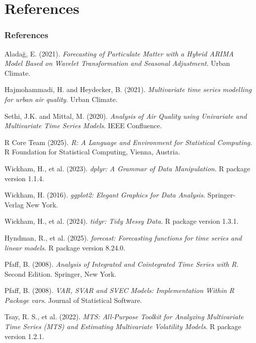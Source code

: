 \documentclass[svgnames, 12pt]{beamer}
\begin{document}
\section*{References}
\begin{frame}[allowframebreaks] %
    \frametitle{References}
    \footnotesize
    \begin{thebibliography}{99} %
        Aladağ, E. (2021). \textit{Forecasting of Particulate Matter with a Hybrid ARIMA Model Based on Wavelet Transformation and Seasonal Adjustment}. Urban Climate.
        
        Hajmohammadi, H. and Heydecker, B. (2021). \textit{Multivariate time series modelling for urban air quality}. Urban Climate.
        
        Sethi, J.K. and Mittal, M. (2020). \textit{Analysis of Air Quality using Univariate and Multivariate Time Series Models}. IEEE Confluence.
        
        R Core Team (2025). \textit{R: A Language and Environment for Statistical Computing}. R Foundation for Statistical Computing, Vienna, Austria.
        
        Wickham, H., et al. (2023). \textit{dplyr: A Grammar of Data Manipulation}. R package version 1.1.4.
        
        Wickham, H. (2016). \textit{ggplot2: Elegant Graphics for Data Analysis}. Springer-Verlag New York.
        
        \break %

        Wickham, H., et al. (2024). \textit{tidyr: Tidy Messy Data}. R package version 1.3.1.
        
        Hyndman, R., et al. (2025). \textit{forecast: Forecasting functions for time series and linear models}. R package version 8.24.0.
        
        Pfaff, B. (2008). \textit{Analysis of Integrated and Cointegrated Time Series with R}. Second Edition. Springer, New York.
        
        Pfaff, B. (2008). \textit{VAR, SVAR and SVEC Models: Implementation Within R Package vars}. Journal of Statistical Software.
        
        Tsay, R. S., et al. (2022). \textit{MTS: All-Purpose Toolkit for Analyzing Multivariate Time Series (MTS) and Estimating Multivariate Volatility Models}. R package version 1.2.1.
    \end{thebibliography}
\end{frame}
\end{document}

